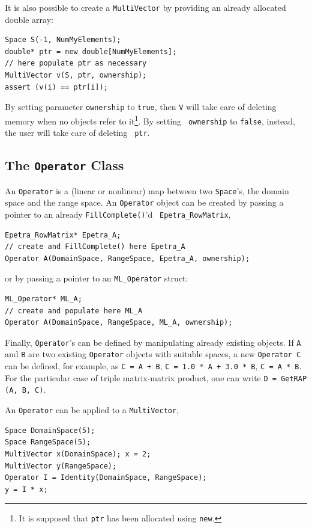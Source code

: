 \documentclass{article}[11pt]
\begin{document}
\smallskip

It is also possible to create a {\tt MultiVector} by providing an already
allocated double array:
\begin{verbatim}
Space S(-1, NumMyElements);
double* ptr = new double[NumMyElements];
// here populate ptr as necessary
MultiVector v(S, ptr, ownership);
assert (v(i) == ptr[i]);
\end{verbatim} 
By setting parameter {\tt ownership} to {\tt true}, then {\tt V} will take
care of deleting memory when no objects refer to it\footnote{It is supposed
  that {\tt ptr} has been allocated using {\tt new}.}. By setting {\tt
  ownership} to {\tt false}, instead, the user will take care of deleting {\tt
    ptr}.

\subsection{The {\tt Operator} Class}
\label{sec:operator}

An {\tt Operator} is a (linear or nonlinear) map between two {\tt Space}'s, the
domain space and the range space. An {\tt Operator} object can be created
by passing a pointer to an already {\tt FillComplete()}'d {\tt
Epetra\_RowMatrix},
\begin{verbatim}
Epetra_RowMatrix* Epetra_A;
// create and FillComplete() here Epetra_A
Operator A(DomainSpace, RangeSpace, Epetra_A, ownership);
\end{verbatim}
or by passing a pointer to an {\tt ML\_Operator} struct:
\begin{verbatim}
ML_Operator* ML_A;
// create and populate here ML_A
Operator A(DomainSpace, RangeSpace, ML_A, ownership);
\end{verbatim}
Finally, {\tt Operator}'s can be defined 
by manipulating already existing objects. If {\tt A} and {\tt B} are two
existing {\tt Operator} objects with suitable spaces, a new {\tt Operator C}
can be defined, for example, as {\tt C = A
+ B}, {\tt C = 1.0 * A + 3.0 * B}, {\tt C = A * B}. For the particular case of
triple matrix-matrix product, one can write {\tt D = GetRAP (A, B, C)}.
%

An {\tt Operator} can be applied to a {\tt MultiVector},
\begin{verbatim}
Space DomainSpace(5);
Space RangeSpace(5);
MultiVector x(DomainSpace); x = 2;
MultiVector y(RangeSpace);
Operator I = Identity(DomainSpace, RangeSpace);
y = I * x;
\end{verbatim}
\end{document}
